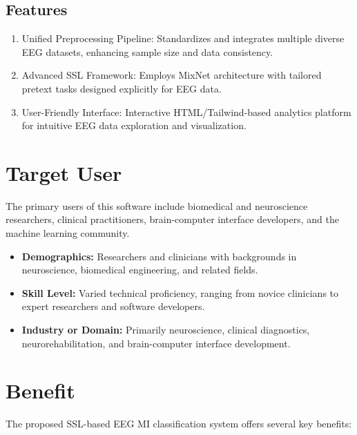 \subsection{Features}
\label{subsection:features}


\begin{enumerate}[leftmargin=80pt]
    \item Unified Preprocessing Pipeline: Standardizes and integrates multiple diverse EEG datasets, enhancing sample size and data consistency.
    \item Advanced SSL Framework: Employs MixNet architecture with tailored pretext tasks designed explicitly for EEG data.
    \item User-Friendly Interface: Interactive HTML/Tailwind-based analytics platform for intuitive EEG data exploration and visualization.
\end{enumerate}


\section{Target User}
\label{section:target-user}


The primary users of this software include biomedical and neuroscience researchers, clinical practitioners, brain-computer interface developers, and the machine learning community.


\begin{itemize}

    \item \textbf{Demographics:} Researchers and clinicians with backgrounds in neuroscience, biomedical engineering, and related fields.

    \item \textbf{Skill Level:} Varied technical proficiency, ranging from novice clinicians to expert researchers and software developers.

    \item \textbf{Industry or Domain:} Primarily neuroscience, clinical diagnostics, neurorehabilitation, and brain-computer interface development.

\end{itemize}


\section{Benefit}
\label{section:benefit}


The proposed SSL-based EEG MI classification system offers several key benefits:


